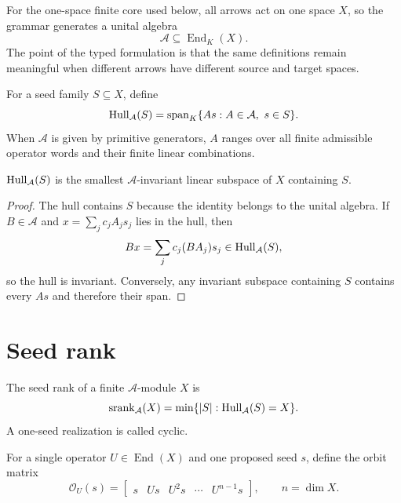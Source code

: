 For the one-space finite core used below, all arrows act on one space $X$, so the grammar generates a unital algebra
\[
\mathcal A\subseteq\operatorname{End}_K(X).
\]
The point of the typed formulation is that the same definitions remain meaningful when different arrows have different source and target spaces.

\begin{definition}
For a seed family $S\subseteq X$, define
\[
\operatorname{Hull}_{\mathcal A}(S)
=
\operatorname{span}_K\{As:A\in\mathcal A,\ s\in S\}.
\]
When $\mathcal A$ is given by primitive generators, $A$ ranges over all finite admissible operator words and their finite linear combinations.
\end{definition}

\begin{theorem}\label{thm:smallest-hull}
$\operatorname{Hull}_{\mathcal A}(S)$ is the smallest $\mathcal A$-invariant linear subspace of $X$ containing $S$.
\end{theorem}

\begin{proof}
The hull contains $S$ because the identity belongs to the unital algebra.  If $B\in\mathcal A$ and $x=\sum_jc_jA_js_j$ lies in the hull, then
\[
Bx=\sum_jc_j(BA_j)s_j\in\operatorname{Hull}_{\mathcal A}(S),
\]
so the hull is invariant.  Conversely, any invariant subspace containing $S$ contains every $As$ and therefore their span.
\end{proof}


\section{Seed rank}
\begin{definition}
The seed rank of a finite $\mathcal A$-module $X$ is
\[
\operatorname{srank}_{\mathcal A}(X)
=
\min\{|S|:\operatorname{Hull}_{\mathcal A}(S)=X\}.
\]
A one-seed realization is called cyclic.
\end{definition}

For a single operator $U\in\operatorname{End}(X)$ and one proposed seed $s$, define the orbit matrix
\[
\mathcal O_U(s)=\begin{bmatrix}s&Us&U^2s&\cdots&U^{n-1}s\end{bmatrix},
\qquad n=\dim X.
\]

